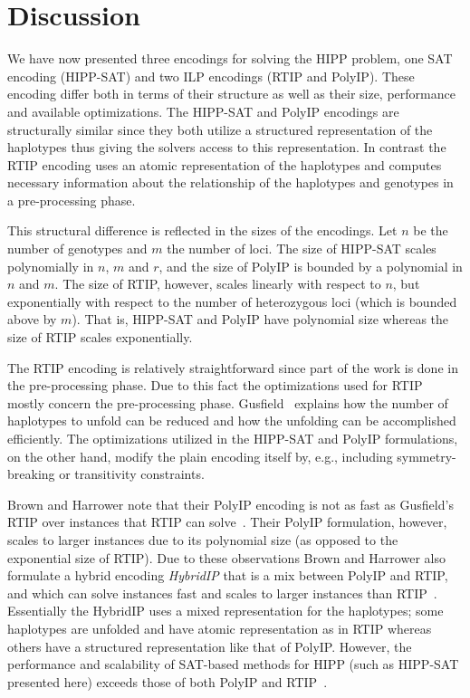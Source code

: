 \documentclass[12pt,a4paper]{article}
\begin{document}
\section{Discussion}

We have now presented three encodings for solving the HIPP problem, one SAT encoding (HIPP-SAT) and two ILP encodings (RTIP and PolyIP).
These encoding differ both in terms of their structure as well as their size, performance and available optimizations.
The HIPP-SAT and PolyIP encodings are structurally similar since they both utilize a structured representation of the haplotypes thus giving the solvers access to this representation.
In contrast the RTIP encoding uses an atomic representation of the haplotypes and computes necessary information about the relationship of the haplotypes and genotypes in a pre-processing phase.

This structural difference is reflected in the sizes of the encodings.
Let $n$ be the number of genotypes and $m$ the number of loci.
The size of HIPP-SAT scales polynomially in $n$, $m$ and $r$, and the size of PolyIP is bounded by a polynomial in $n$ and $m$.
The size of RTIP, however, scales linearly with respect to $n$, but exponentially with respect to the number of heterozygous loci (which is bounded above by $m$).
That is, HIPP-SAT and PolyIP have polynomial size whereas the size of RTIP scales exponentially.

The RTIP encoding is relatively straightforward since part of the work is done in the pre-processing phase.
Due to this fact the optimizations used for RTIP mostly concern the pre-processing phase.
Gusfield~\cite{DBLP:conf/cpm/Gusfield03} explains how the number of haplotypes to unfold can be reduced and how the unfolding can be accomplished efficiently.
The optimizations utilized in the HIPP-SAT and PolyIP formulations, on the other hand, modify the plain encoding itself by, e.g., including symmetry-breaking or transitivity constraints.

Brown and Harrower note that their PolyIP encoding is not as fast as Gusfield's RTIP over instances that RTIP can solve~\cite{DBLP:journals/tcbb/BrownH06}.
Their PolyIP formulation, however, scales to larger instances due to its polynomial size (as opposed to the exponential size of RTIP).
Due to these observations Brown and Harrower also formulate a hybrid encoding \emph{HybridIP} that is a mix between PolyIP and RTIP, and which can solve instances fast and scales to larger instances than RTIP~\cite{DBLP:conf/cpm/Gusfield03}.
Essentially the HybridIP uses a mixed representation for the haplotypes; 
some haplotypes are unfolded and have atomic representation as in RTIP whereas others have a structured representation like that of PolyIP.
However, the performance and scalability of SAT-based methods for HIPP (such as HIPP-SAT presented here) exceeds those of both PolyIP and RTIP~\cite{DBLP:journals/jcb/GracaLMO10}.
\end{document}

